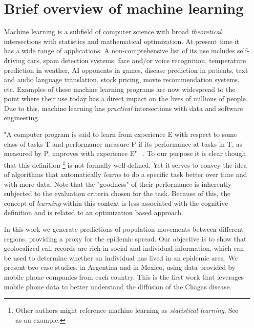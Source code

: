 \section{Brief overview of machine learning}

Machine learning is a subfield of computer science with broad \textit{theoretical} intersections with statistics and mathematical optimization. At present time it has a wide range of applications. A non-comprehensive list of its use includes self-driving cars, spam detection systems, face and/or voice recognition, temperature prediction in weather, AI opponents in games, disease prediction in patients, text and audio language translation, stock pricing, movie recommendation systems, etc. Examples of these machine learning programs are now widespread to the point where their use today has a direct impact on the lives of millions of people. Due to this, machine learning has \textit{practical} intersections with data and software engineering.

"A computer program is said to learn from experience E with respect to some class of tasks T and performance measure P if its performance at tasks in T, as measured by P, improves with experience E" ~\textcite{Mitchell-MLearning}. To our purpose it is clear though that this definition \footnote{Other authors might reference machine learning as \textit{statistical learning}. See ~\textcite{hastie-elemstatslearn} as an example.} is not formally well-defined. Yet it serves to convey the idea of algorithms that automatically \textit{learns} to do a specific task better over time and with more data. Note that the "goodness" of their performance is inherently subjected to the evaluation criteria chosen for the task. Because of this, the concept of \textit{learning} within this context is less associated with the cognitive definition and is related to an optimization based approach.

 In this work we generate predictions of population movements between different regions, providing a proxy for the epidemic spread. Our objective is to show that geolocalized call records are rich in social and individual information, which can be used to determine whether an individual has lived in an epidemic area. We present two case studies, in Argentina and in Mexico, using data provided by mobile phone companies from each country. %
This is the first work that leverages mobile phone data to better understand the diffusion of the Chagas disease.




